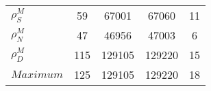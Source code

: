 \begin{center}
\begin{longtable}{lcccc}
$ {\rho^{M}_{S}}       $	 & 	                   59	 & 	                67001	 & 	                67060	 & 	                   11 \\ 
$ {\rho^{M}_{N}}       $	 & 	                   47	 & 	                46956	 & 	                47003	 & 	                    6 \\ 
$ {\rho^{M}_{D}}       $	 & 	                  115	 & 	               129105	 & 	               129220	 & 	                   15 \\ 
$Maximum               $	 & 	                  125	 & 	               129105	 & 	               129220	 & 	                   18 \\ 
\end{longtable}
 \end{center}
